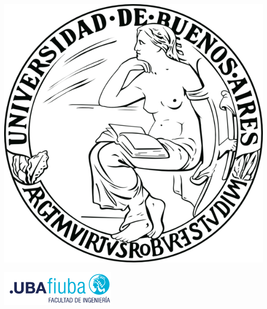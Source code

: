 \begin{titlepage}

\begin{center}
	\begin{minipage}{2.5cm}
	\begin{center}
		\includegraphics[width=\textwidth]{cover/uba_logo.png}
		
	\end{center}
\end{minipage}\hfill
\begin{minipage}{8cm}
	
\end{minipage}\hfill
\begin{minipage}{4cm}
	\begin{center}
		\includegraphics[width=\textwidth]{cover/fiuba_logo.png}
	\end{center}
\end{minipage}


\end{center}
\end{titlepage}
